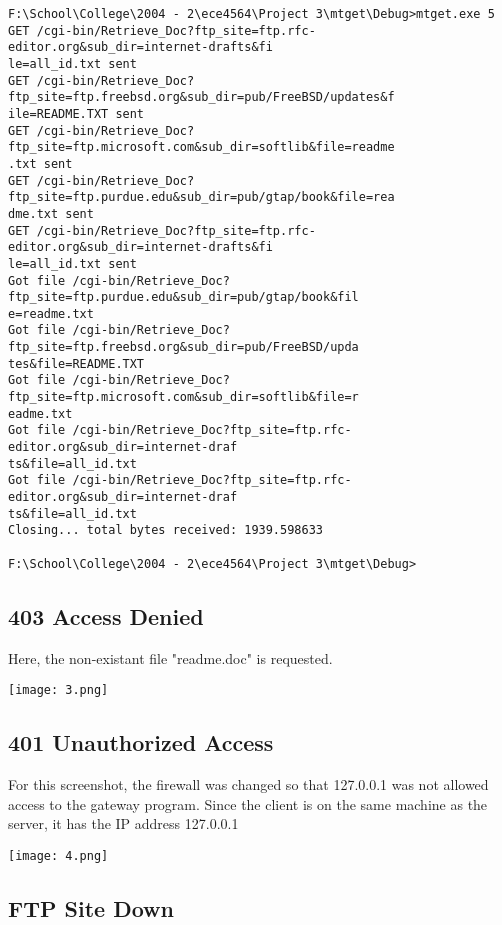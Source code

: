 \documentclass[11pt]{report}
\begin{document}
\begin{verbatim}
F:\School\College\2004 - 2\ece4564\Project 3\mtget\Debug>mtget.exe 5
GET /cgi-bin/Retrieve_Doc?ftp_site=ftp.rfc-editor.org&sub_dir=internet-drafts&fi
le=all_id.txt sent
GET /cgi-bin/Retrieve_Doc?ftp_site=ftp.freebsd.org&sub_dir=pub/FreeBSD/updates&f
ile=README.TXT sent
GET /cgi-bin/Retrieve_Doc?ftp_site=ftp.microsoft.com&sub_dir=softlib&file=readme
.txt sent
GET /cgi-bin/Retrieve_Doc?ftp_site=ftp.purdue.edu&sub_dir=pub/gtap/book&file=rea
dme.txt sent
GET /cgi-bin/Retrieve_Doc?ftp_site=ftp.rfc-editor.org&sub_dir=internet-drafts&fi
le=all_id.txt sent
Got file /cgi-bin/Retrieve_Doc?ftp_site=ftp.purdue.edu&sub_dir=pub/gtap/book&fil
e=readme.txt
Got file /cgi-bin/Retrieve_Doc?ftp_site=ftp.freebsd.org&sub_dir=pub/FreeBSD/upda
tes&file=README.TXT
Got file /cgi-bin/Retrieve_Doc?ftp_site=ftp.microsoft.com&sub_dir=softlib&file=r
eadme.txt
Got file /cgi-bin/Retrieve_Doc?ftp_site=ftp.rfc-editor.org&sub_dir=internet-draf
ts&file=all_id.txt
Got file /cgi-bin/Retrieve_Doc?ftp_site=ftp.rfc-editor.org&sub_dir=internet-draf
ts&file=all_id.txt
Closing... total bytes received: 1939.598633

F:\School\College\2004 - 2\ece4564\Project 3\mtget\Debug>
\end{verbatim}

\subsection{403 Access Denied}

Here, the non-existant file "readme.doc" is requested.

\begin{center}
\texttt{[image: 3.png]}
\end{center}

\subsection{401 Unauthorized Access}

For this screenshot, the firewall was changed so that 127.0.0.1 was not allowed access to the gateway program. Since the client is on the same machine as the server, it has the IP address 127.0.0.1

\begin{center}
\texttt{[image: 4.png]}
\end{center}

\subsection{FTP Site Down}
\end{document}
